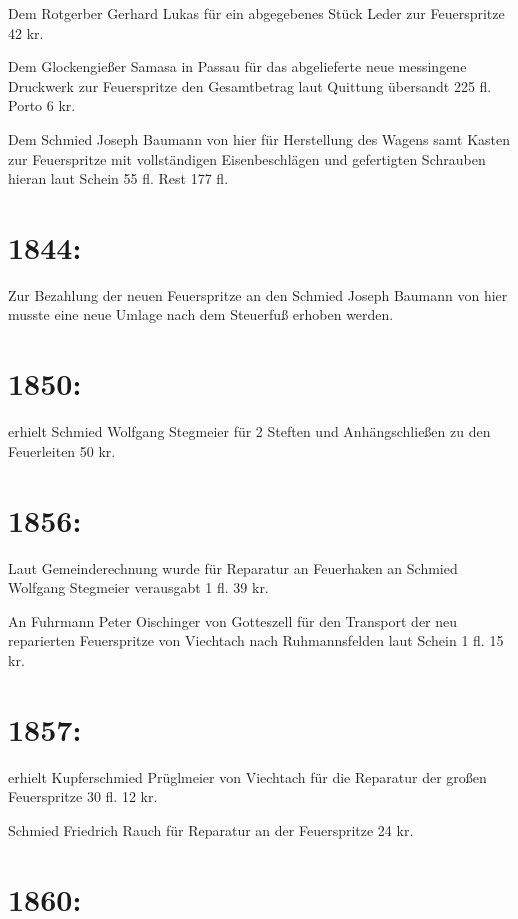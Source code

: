 \documentclass[12pt,a4paper]{book}
\begin{document}
Dem Rotgerber Gerhard Lukas für ein abgegebenes Stück Leder zur Feuerspritze 42
kr.

Dem Glockengießer Samasa in Passau für das abgelieferte neue messingene
Druckwerk zur Feuerspritze den Gesamtbetrag laut Quittung übersandt 225 fl.
Porto 6 kr.

Dem Schmied Joseph Baumann von hier für Herstellung des Wagens samt Kasten zur
Feuerspritze mit vollständigen Eisenbeschlägen und gefertigten Schrauben hieran
laut Schein 55 fl. Rest 177 fl.

\section{1844:}

Zur Bezahlung der neuen Feuerspritze an den Schmied Joseph Baumann von hier
musste eine neue Umlage nach dem Steuerfuß erhoben werden.

\section{1850:}

erhielt Schmied Wolfgang Stegmeier für 2 Steften und Anhängschließen zu den
Feuerleiten 50 kr.

\section{1856:}

Laut Gemeinderechnung wurde für Reparatur an Feuerhaken an Schmied Wolfgang
Stegmeier verausgabt 1 fl. 39 kr.

An Fuhrmann Peter Oischinger von Gotteszell für den Transport der neu
reparierten Feuerspritze von Viechtach nach Ruhmannsfelden laut Schein 1 fl. 15
kr.

\section{1857:}

erhielt Kupferschmied Prüglmeier von Viechtach für die Reparatur der großen
Feuerspritze 30 fl. 12 kr.

Schmied Friedrich Rauch für Reparatur an der Feuerspritze 24 kr.

\section{1860:}
\end{document}
